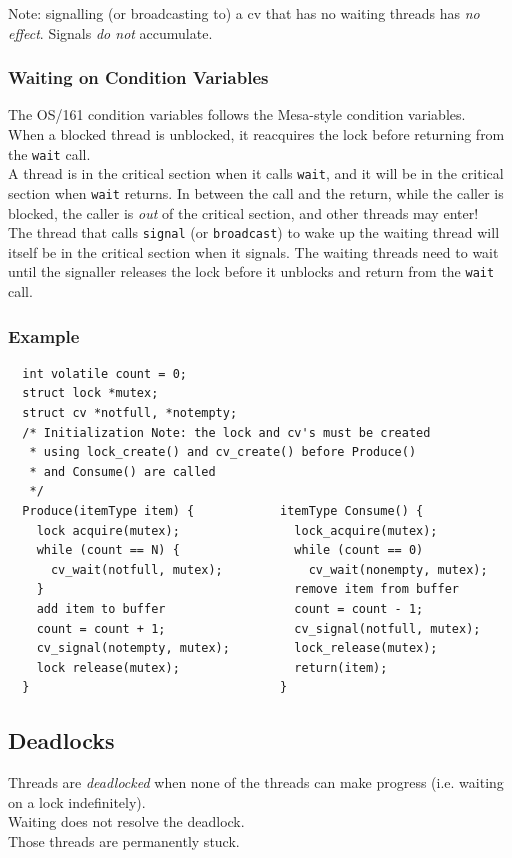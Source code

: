 \documentclass[12pt]{article}
\theoremstyle{plain}
\theoremstyle{definition}
\begin{document}
Note: signalling (or broadcasting to) a cv that has no waiting threads has \emph{no effect}.
Signals \emph{do not} accumulate.

\subsubsection{Waiting on Condition Variables}
The OS/161 condition variables follows the Mesa-style condition variables. \\
When a blocked thread is unblocked, it reacquires the lock before returning from the \texttt{wait} call. \\
A thread is in the critical section when it calls \texttt{wait}, and it will be in the critical section when \texttt{wait} returns.
In between the call and the return, while the caller is blocked, the caller is \emph{out} of the critical section, and other threads may enter! \\
The thread that calls \texttt{signal} (or \texttt{broadcast}) to wake up the waiting thread will itself be in the critical section when it signals.
The waiting threads need to wait until the signaller releases the lock before it unblocks and return from the \texttt{wait} call.

\subsubsection{Example}
\begin{verbatim}
  int volatile count = 0;
  struct lock *mutex;
  struct cv *notfull, *notempty;
  /* Initialization Note: the lock and cv's must be created
   * using lock_create() and cv_create() before Produce()
   * and Consume() are called
   */
  Produce(itemType item) {            itemType Consume() {
    lock acquire(mutex);                lock_acquire(mutex);
    while (count == N) {                while (count == 0)
      cv_wait(notfull, mutex);            cv_wait(nonempty, mutex);
    }                                   remove item from buffer
    add item to buffer                  count = count - 1;
    count = count + 1;                  cv_signal(notfull, mutex);
    cv_signal(notempty, mutex);         lock_release(mutex);
    lock release(mutex);                return(item);
  }                                   }
\end{verbatim}

\subsection{Deadlocks}
Threads are \emph{deadlocked} when none of the threads can make progress (i.e. waiting on a lock indefinitely). \\
Waiting does not resolve the deadlock. \\
Those threads are permanently stuck.
\end{document}
